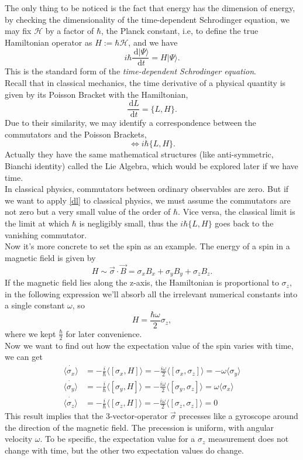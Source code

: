 \documentclass{article}
\newcommand{\be}{\begin{equation}}
\newcommand{\ee}{\end{equation}}
\newcommand{\dif}{\,\mathrm{d}}
\renewcommand{\1}{\left}
\renewcommand{\2}{\right}
\newcommand{\ma}{\mathcal}
\newcommand{\la}{\langle}
\newcommand{\ra}{\rangle}
\newcommand{\sig}{\sigma}
\newcommand{\om}{\omega}
\begin{document}
The only thing to be noticed is the fact that energy has the dimension of energy, by checking the dimensionality of the time-dependent Schrodinger equation, we may fix $\ma H$ by a factor of $\hbar$, the Planck constant, i.e, to define the true Hamiltonian operator as $H:=\hbar \ma H$, and we have
\be
i\hbar\frac{\dif |\Psi\ra}{\dif t}= H|\Psi\ra.
\ee
This is the standard form of the \textit{time-dependent Schrodinger equation}.\\

Recall that in classical mechanics, the time derivative of a physical quantity is given by its Poisson Bracket with the Hamiltonian,
\be
\frac{\dif L}{\dif t}=\{L, H\}.
\ee
Due to their similarity, we may identify a correspondence between the commutators and the Poisson Brackets,
\be
[L,H] \iff  i \hbar\{L, H\}.
\ee
{\color{blue}Actually they have the same mathematical structures (like anti-symmetric, Bianchi identity) called the Lie Algebra, which would be explored later if we have time.}\\
In classical physics, commutators between ordinary observables are zero. But if we want to apply \eqref{dl} to classical physics, we must assume the commutators are not zero but a very small value of the order of $\hbar$. Vice versa, the classical limit is the limit at which $\hbar$ is negligibly small, thus the $i\hbar\{L,H\}$ goes back to the vanishing commutator.\\

Now it's more concrete to set the spin as an example. The energy of a spin in a magnetic field is given by
\be
H\sim \vec\sig\cdot\vec B=\sig_x B_x+\sig_y B_y+\sig_z B_z.
\ee
If the magnetic field lies along the z-axis, the Hamiltonian is proportional to $\sig_z$, in the following expression we'll absorb all the irrelevant numerical constants into a single constant $\omega$, so
\be 
H=\frac{\hbar\omega}{2} \sig_z,
\ee
where we kept $\frac\hbar 2$ for later convenience.\\
Now we want to find out how the expectation value of the spin varies with time, we can get
\be\begin{split}
\dot{\la\sig_x\ra}&=-\frac i \hbar \la[\sig_x,H]\ra=-\frac{i\omega} 2\la[\sig_x,\sig_z]\ra=-\om\la\sig_y\ra\\
\dot{\la\sig_y\ra}&=-\frac i \hbar \la[\sig_y,H]\ra=-\frac{i\omega} 2\la[\sig_y,\sig_z]\ra=\om\la\sig_x\ra\\
\dot{\la\sig_z\ra}&=-\frac i \hbar \la[\sig_z,H]\ra=-\frac{i\omega} 2\la[\sig_z,\sig_z]\ra=0
\end{split}\ee
This result implies that the 3-vector-operator $\vec\sig$ precesses like a gyroscope around the direction of the magnetic field. The precession is uniform, with angular velocity $\om$. To be specific, the expectation value for a $\sig_z$ measurement does not change with time, but the other two expectation values do change.\\
\end{document}

